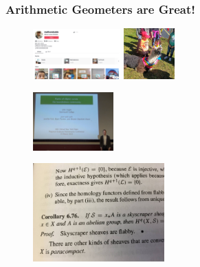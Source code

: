 \begin{frame}[plain] \frametitle{Arithmetic Geometers are Great!}
	\begin{figure}[ht]
	\includegraphics[width=0.30\textwidth]{images/lozanotiktok.png}
	\includegraphics[width=0.175\textwidth]{images/llama.jpeg}
	\end{figure}

	\begin{figure}[ht]
	\includegraphics[width=0.275\textwidth]{images/voight.png}
	\end{figure}
	
	\begin{figure}[ht]
	\includegraphics[width=0.45\textwidth]{images/flabby.jpg}
	\end{figure}	
\end{frame}



\begin{frame}[plain]
\end{frame}